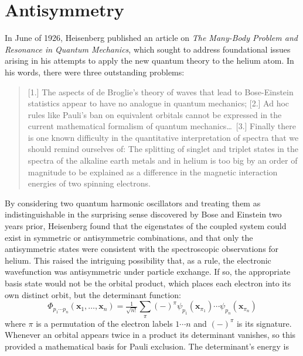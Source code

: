 \section{Antisymmetry}

In June of 1926, Heisenberg published an article on {\itshape The Many-Body
Problem and Resonance in Quantum Mechanics}, which sought to address
foundational issues arising in his attempts to apply the new quantum theory to
the helium atom.
In his words, there were three outstanding problems:
\begin{quote}
    [1.] The aspects of de Broglie's theory of waves that lead to Bose-Einstein
    statistics appear to have no analogue in quantum mechanics;
    [2.] Ad hoc rules like Pauli's ban on equivalent orbitals cannot be
    expressed in the current mathematical formalism of quantum mechanics\dots\ 
    [3.] Finally there is one known difficulty in the quantitative
    interpretation of spectra that we should remind ourselves of:
    The splitting of singlet and triplet states in the spectra of the alkaline
    earth metals and in helium is too big by an order of magnitude to be
    explained as a difference in the magnetic interaction energies of two
    spinning electrons.\cite{Heisenberg:1926p411}
\end{quote}
By considering two quantum harmonic oscillators and treating them as
indistinguishable in the surprising sense discovered by Bose\cite{Bose:1924p178}
and Einstein\cite{Einstein:1924p261} two years prior, Heisenberg found that the
eigenstates of the coupled system could exist in symmetric or antisymmetric
combinations, and that only the antisymmetric states were consistent with the
spectroscopic observations for helium.
This raised the intriguing possibility that, as a rule, the electronic
wavefunction was antisymmetric under particle exchange.
If so, the appropriate basis state would not be the orbital product, which
places each electron into its own distinct orbit, but the determinant function:
\begin{equation}
    \Phi_{p_1\cdots p_n}(\mathbf{x}_1, \ldots, \mathbf{x}_n)
    =
    \tfrac{1}{\sqrt{n!}}
    \sum_\pi
    (-)^\pi
    \psi_{p_1}(\mathbf{x}_{\pi_1})
    \cdots
    \psi_{p_n}(\mathbf{x}_{\pi_n})
\end{equation}
where \(\pi\) is a permutation of the electron labels \(1\cdots n\) and
\((-)^\pi\) is its signature.
Whenever an orbital appears twice in a product its determinant vanishes, so this
provided a mathematical basis for Pauli exclusion.
The determinant's energy is
